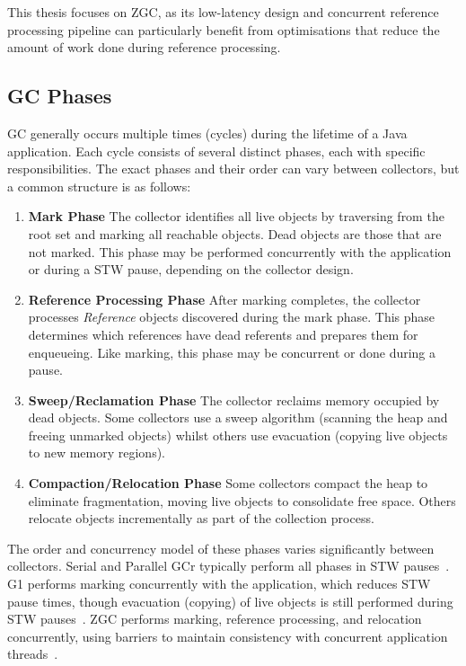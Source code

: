 This thesis focuses on \ac{ZGC}, as its low-latency design and concurrent reference processing pipeline can particularly benefit from optimisations that reduce the amount of work done during reference processing.

\subsection{GC Phases}
\label{subsec:bg-gc-phases}

\ac{GC} generally occurs multiple times (cycles) during the lifetime of a Java application. Each cycle consists of several distinct phases, each with specific responsibilities. The exact phases and their order can vary between collectors, but a common structure is as follows:

\begin{enumerate}
    \item \textbf{Mark Phase}   The collector identifies all live objects by traversing from the root set and marking all reachable objects. Dead objects are those that are not marked. This phase may be performed concurrently with the application or during a \ac{STW} pause, depending on the collector design.
    
    \item \textbf{Reference Processing Phase}   After marking completes, the collector processes \textit{Reference} objects discovered during the mark phase. This phase determines which references have dead referents and prepares them for enqueueing. Like marking, this phase may be concurrent or done during a pause.
    
    \item \textbf{Sweep/Reclamation Phase}   The collector reclaims memory occupied by dead objects. Some collectors use a sweep algorithm (scanning the heap and freeing unmarked objects) whilst others use evacuation (copying live objects to new memory regions).
    
    \item \textbf{Compaction/Relocation Phase}   Some collectors compact the heap to eliminate fragmentation, moving live objects to consolidate free space. Others relocate objects incrementally as part of the collection process.
\end{enumerate}

The order and concurrency model of these phases varies significantly between collectors. Serial and Parallel \ac{GCr} typically perform all phases in \ac{STW} pauses~\cite{oracle-gc-collectors}. G1 performs marking concurrently with the application, which reduces \ac{STW} pause times, though evacuation (copying) of live objects is still performed during \ac{STW} pauses~\cite{oracle-gc-collectors}. \ac{ZGC} performs marking, reference processing, and relocation concurrently, using barriers to maintain consistency with concurrent application threads~\cite{jep333-zgc,jep439-genzgc}.

